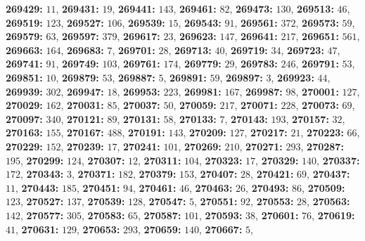 \textsf{\bfseries 269429:} $11$, \textsf{\bfseries 269431:} $19$, \textsf{\bfseries 269441:} $143$, \textsf{\bfseries 269461:} $82$, \textsf{\bfseries 269473:} $130$, \textsf{\bfseries 269513:} $46$, \textsf{\bfseries 269519:} $123$, \textsf{\bfseries 269527:} $106$, \textsf{\bfseries 269539:} $15$, \textsf{\bfseries 269543:} $91$, \textsf{\bfseries 269561:} $372$, \textsf{\bfseries 269573:} $59$, \textsf{\bfseries 269579:} $63$, \textsf{\bfseries 269597:} $379$, \textsf{\bfseries 269617:} $23$, \textsf{\bfseries 269623:} $147$, \textsf{\bfseries 269641:} $217$, \textsf{\bfseries 269651:} $561$, \textsf{\bfseries 269663:} $164$, \textsf{\bfseries 269683:} $7$, \textsf{\bfseries 269701:} $28$, \textsf{\bfseries 269713:} $40$, \textsf{\bfseries 269719:} $34$, \textsf{\bfseries 269723:} $47$, \textsf{\bfseries 269741:} $91$, \textsf{\bfseries 269749:} $103$, \textsf{\bfseries 269761:} $174$, \textsf{\bfseries 269779:} $29$, \textsf{\bfseries 269783:} $246$, \textsf{\bfseries 269791:} $53$, \textsf{\bfseries 269851:} $10$, \textsf{\bfseries 269879:} $53$, \textsf{\bfseries 269887:} $5$, \textsf{\bfseries 269891:} $59$, \textsf{\bfseries 269897:} $3$, \textsf{\bfseries 269923:} $44$, \textsf{\bfseries 269939:} $302$, \textsf{\bfseries 269947:} $18$, \textsf{\bfseries 269953:} $223$, \textsf{\bfseries 269981:} $167$, \textsf{\bfseries 269987:} $98$, \textsf{\bfseries 270001:} $127$, \textsf{\bfseries 270029:} $162$, \textsf{\bfseries 270031:} $85$, \textsf{\bfseries 270037:} $50$, \textsf{\bfseries 270059:} $217$, \textsf{\bfseries 270071:} $228$, \textsf{\bfseries 270073:} $69$, \textsf{\bfseries 270097:} $340$, \textsf{\bfseries 270121:} $89$, \textsf{\bfseries 270131:} $58$, \textsf{\bfseries 270133:} $7$, \textsf{\bfseries 270143:} $193$, \textsf{\bfseries 270157:} $32$, \textsf{\bfseries 270163:} $155$, \textsf{\bfseries 270167:} $488$, \textsf{\bfseries 270191:} $143$, \textsf{\bfseries 270209:} $127$, \textsf{\bfseries 270217:} $21$, \textsf{\bfseries 270223:} $66$, \textsf{\bfseries 270229:} $152$, \textsf{\bfseries 270239:} $17$, \textsf{\bfseries 270241:} $101$, \textsf{\bfseries 270269:} $210$, \textsf{\bfseries 270271:} $293$, \textsf{\bfseries 270287:} $195$, \textsf{\bfseries 270299:} $124$, \textsf{\bfseries 270307:} $12$, \textsf{\bfseries 270311:} $104$, \textsf{\bfseries 270323:} $17$, \textsf{\bfseries 270329:} $140$, \textsf{\bfseries 270337:} $172$, \textsf{\bfseries 270343:} $3$, \textsf{\bfseries 270371:} $182$, \textsf{\bfseries 270379:} $153$, \textsf{\bfseries 270407:} $28$, \textsf{\bfseries 270421:} $69$, \textsf{\bfseries 270437:} $11$, \textsf{\bfseries 270443:} $185$, \textsf{\bfseries 270451:} $94$, \textsf{\bfseries 270461:} $46$, \textsf{\bfseries 270463:} $26$, \textsf{\bfseries 270493:} $86$, \textsf{\bfseries 270509:} $123$, \textsf{\bfseries 270527:} $137$, \textsf{\bfseries 270539:} $128$, \textsf{\bfseries 270547:} $5$, \textsf{\bfseries 270551:} $92$, \textsf{\bfseries 270553:} $28$, \textsf{\bfseries 270563:} $142$, \textsf{\bfseries 270577:} $305$, \textsf{\bfseries 270583:} $65$, \textsf{\bfseries 270587:} $101$, \textsf{\bfseries 270593:} $38$, \textsf{\bfseries 270601:} $76$, \textsf{\bfseries 270619:} $41$, \textsf{\bfseries 270631:} $129$, \textsf{\bfseries 270653:} $293$, \textsf{\bfseries 270659:} $140$, \textsf{\bfseries 270667:} $5$, 
